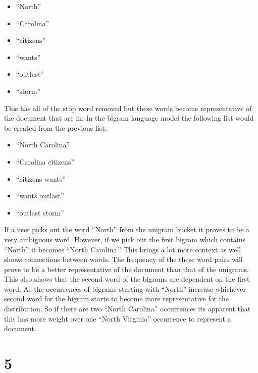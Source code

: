 \documentclass[letterpaper,11pt]{article}
\newcommand*{\srcPath}{../src}%
\begin{document}
\begin{itemize}
  \item ``North''
  \item ``Carolina''
  \item ``citizens''
  \item ``wants''
  \item ``outlast''
  \item ``storm''
\end{itemize}

This has all of the stop word removed but these words become representative of the document that are in.
In the bigram language model the following list would be created from the previous list:

\begin{itemize}
  \item ``North Carolina''
  \item ``Carolina citizens''
  \item ``citizens wants''
  \item ``wants outlast''
  \item ``outlast storm''
\end{itemize}

If a user picks out the word ``North'' from the unigram bucket it proves to be a very ambiguous word.
However, if we pick out the first bigram which contains ``North'' it becomes ``North Carolina.''
This brings a lot more context as well shows connections between words.
The frequency of the these word pairs will prove to be a better representative of the document than that of the unigrams.
This also shows that the second word of the bigrams are dependent on the first word.
As the occurrences of bigrams starting with ``North'' increase whichever second word for the bigram starts to become more representative for the distribution.
So if there are two ``North Carolina'' occurrences its apparent that this has more weight over one ``North Virginia'' occurrence to represent a document.

% 

\clearpage



\section*{5}
\end{document}
